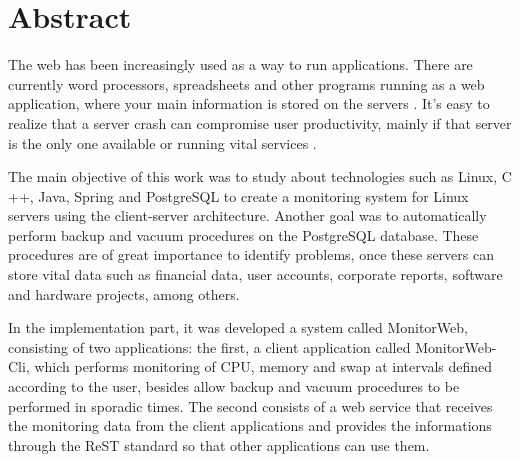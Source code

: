 
\chapter*{Abstract}

The web has been increasingly used as a way to run applications. There are currently word processors, spreadsheets and other programs running as a web application, where your main information is stored on the servers \cite{Marimoto:2011}. It's easy to realize that a server crash can compromise user productivity, mainly if that server is the only one available or running vital services \cite{Weber:2002}.

The main objective of this work was to study about technologies such as Linux, C ++, Java, Spring and PostgreSQL to create a monitoring system for Linux servers using the client-server architecture. Another goal was to automatically perform backup and vacuum procedures on the PostgreSQL database. These procedures are of great importance to identify problems, once these servers can store vital data such as financial data, user accounts, corporate reports, software and hardware projects, among others.

In the implementation part, it was developed a system called MonitorWeb, consisting of two applications: the first, a client application called MonitorWeb-Cli, which performs monitoring of CPU, memory and swap at intervals defined according to the user, besides allow backup and vacuum procedures to be performed in sporadic times. The second consists of a web service that receives the monitoring data from the client applications and provides the informations through the ReST standard so that other applications can use them.

